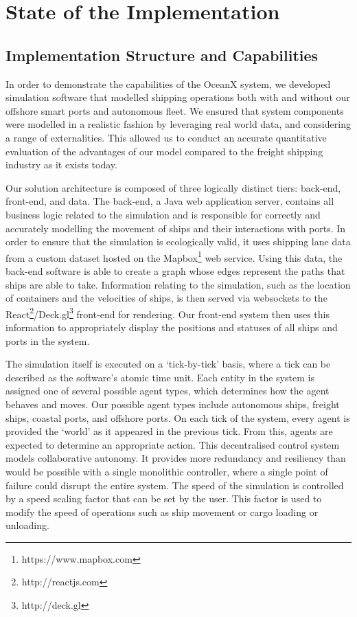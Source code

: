 \newpage
\section{State of the Implementation}
\label{sec:system_state}

\subsection{Implementation Structure and Capabilities}

In order to demonstrate the capabilities of the OceanX system, we developed simulation software that modelled shipping operations both with and without our offshore smart ports and autonomous fleet. We ensured that system components were modelled in a realistic fashion by leveraging real world data, and considering a range of externalities. This allowed us to conduct an accurate quantitative evaluation of the advantages of our model compared to the freight shipping industry as it exists today.

Our solution architecture is composed of three logically distinct tiers: back-end, front-end, and data. The back-end, a Java web application server, contains all business logic related to the simulation and is responsible for correctly and accurately modelling the movement of ships and their interactions with ports. In order to ensure that the simulation is ecologically valid, it uses shipping lane data from a custom dataset hosted on the Mapbox\footnote{https://www.mapbox.com} web service. Using this data, the back-end software is able to create a graph whose edges represent the paths that ships are able to take. Information relating to the simulation, such as the location of containers and the velocities of ships, is then served via websockets to the React\footnote{http://reactjs.com}/Deck.gl\footnote{http://deck.gl} front-end for rendering. Our front-end system then uses this information to appropriately display the positions and statuses of all ships and ports in the system.

The simulation itself is executed on a `tick-by-tick’ basis, where a tick can be described as the software’s atomic time unit. Each entity in the system is assigned one of several possible agent types, which determines how the agent behaves and moves. Our possible agent types include autonomous ships, freight ships, coastal ports, and offshore ports. On each tick of the system, every agent is provided the ‘world’ as it appeared in the previous tick. From this, agents are expected to determine an appropriate action. This decentralised control system models collaborative autonomy. It provides more redundancy and resiliency than would be possible with a single monolithic controller, where a single point of failure could disrupt the entire system. The speed of the simulation is controlled by a speed scaling factor that can be set by the user. This factor is used to modify the speed of operations such as ship movement or cargo loading or unloading. 

